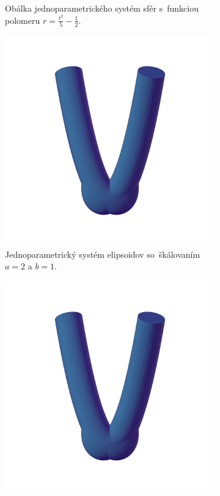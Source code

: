 \begin{figure}[h]
\begin{subfigure}[t]{0.49\textwidth}
        	\caption{Obálka jednoparametrického systém sfér s~funkciou polomeru $r=\frac{t^2}{5}-\frac{1}{2}$.}
        \label{fig:plocha4}
    \end{subfigure}
    \begin{subfigure}[t]{0.49\textwidth}
        \centering
        \includegraphics[width=\textwidth, trim=0mm 50mm 0mm 50mm, clip=true]{images/bienert_ellipsoids.png}
		\caption{Jednoparametrický systém elipsoidov so~škálovaním $a=2$ a $b=1$.}
        \label{fig:plocha5}
    \end{subfigure}
    \hfill
    \begin{subfigure}[t]{0.49\textwidth}
        \centering
        \includegraphics[width=\textwidth, trim=0mm 50mm 0mm 100mm, clip=true]{images/bienert_ellipsoids.png}

\end{subfigure}
\end{figure}
